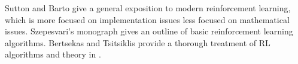 Sutton and Barto \cite{SuttonB98} give a general exposition to modern reinforcement learning, which is more focused on implementation issues less focused on mathematical issues. Szepesvari's monograph \cite{Szepesvari} gives an outline of basic reinforcement learning algorithms. Bertsekas and Tsitsiklis provide a thorough treatment of RL algorithms and theory in \cite{BertsekasTsitsiklis96}.





